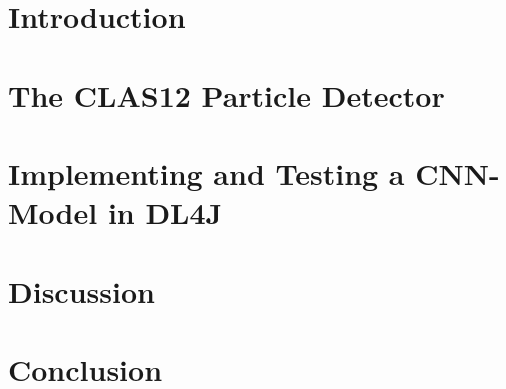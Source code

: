 \documentclass[a4paper, english]{scrreprt}
\begin{document}


\onehalfspacing


\setcounter{tocdepth}{3}
\setcounter{secnumdepth}{3}
\tableofcontents

\chapter{Introduction}

\chapter{The CLAS12 Particle Detector}





\chapter{Implementing and Testing a CNN-Model in DL4J}

\chapter{Discussion}

\chapter{Conclusion}

\printbibliography

\listoffigures
\end{document}

